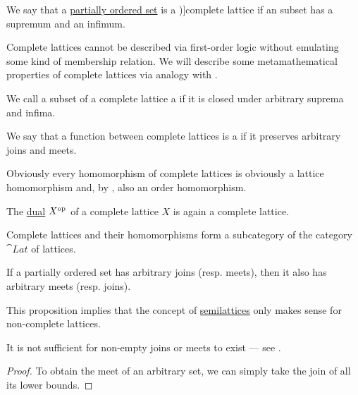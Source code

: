 \begin{definition}\label{def:complete_lattice}
  We say that a \hyperref[def:partially_ordered_set]{partially ordered set} is a \term[ru=полная (решётка) (\cite[133]{Гуров2013})]{complete lattice} if an  subset has a supremum and an infimum.

  Complete lattices cannot be described via first-order logic without emulating some kind of membership relation. We will describe some metamathematical properties of complete lattices via analogy with .
  \begin{thmenum}
     We call a subset of a complete lattice a  if it is closed under arbitrary suprema and infima.

    \mimprovised We say that a function between complete lattices is a  if it preserves arbitrary joins and meets.

    Obviously every homomorphism of complete lattices is obviously a lattice homomorphism and, by , also an order homomorphism.

     The \hyperref[def:preordered_set/opposite]{dual} \( X^{\operatorname{op}} \) of a complete lattice \( X \) is again a complete lattice.

     Complete lattices and their homomorphisms form a subcategory of the category \( \cat{Lat} \) of lattices.
  \end{thmenum}
\end{definition}

\begin{proposition}\label{thm:complete_semilattice}
  If a partially ordered set has arbitrary joins (resp. meets), then it also has arbitrary meets (resp. joins).
\end{proposition}
\begin{comments}
  \item This proposition implies that the concept of \hyperref[def:semilattice]{semilattices} only makes sense for non-complete lattices.

  \item It is not sufficient for non-empty joins or meets to exist --- see .
\end{comments}
\begin{proof}
  To obtain the meet of an arbitrary set, we can simply take the join of all its lower bounds.
\end{proof}


